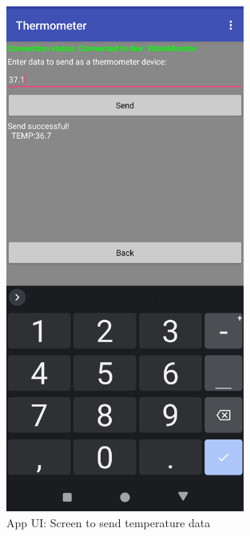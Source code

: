 \newpage
\begin{figure}[H]
	\centering
	\includegraphics[width=0.7\textwidth]{images/app_ui_send_temp}
	\caption{App UI: Screen to send temperature data}
	\label{appendix:app_ui_temp}
\end{figure}

